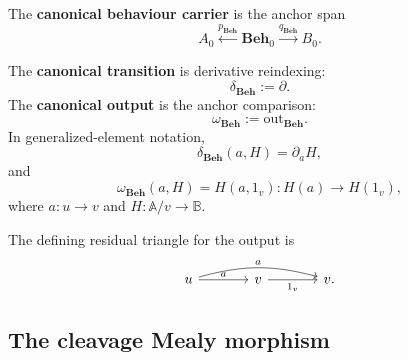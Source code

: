 \begin{definition}
\label{def:canonical-behaviour-carrier}
    The \textbf{canonical behaviour carrier} is the anchor span
    \[
        A_0
        \xleftarrow{p_{\mathbf{Beh}}}
        \mathbf{Beh}_0
        \xrightarrow{q_{\mathbf{Beh}}}
        B_0.
    \]
\end{definition}

\begin{definition}
\label{def:canonical-transition-output}
    The \textbf{canonical transition} is derivative reindexing:
    \[
        \delta_{\mathbf{Beh}}:=\partial.
    \]
    The \textbf{canonical output} is the anchor comparison:
    \[
        \omega_{\mathbf{Beh}}:=\mathrm{out}_{\mathbf{Beh}}.
    \]
    In generalized-element notation,
    \[
        \delta_{\mathbf{Beh}}(a,H)=\partial_aH,
    \]
    and
    \[
        \omega_{\mathbf{Beh}}(a,H)=H(a,1_v):H(a)\to H(1_v),
    \]
    where \(a:u\to v\) and \(H:\mathbb A/v\to\mathbb B\).
\end{definition}

The defining residual triangle for the output is
\[
    \begin{tikzcd}[column sep=large, row sep=large]
            u
                \arrow[r, "a"]
                \arrow[rr, "a", bend left=15]
        &
            v
                \arrow[r, "1_v"']
        &
            v.
    \end{tikzcd}
\]

\subsection{The cleavage Mealy morphism}
\label{subsec:cleavage-mealy-morphism}

